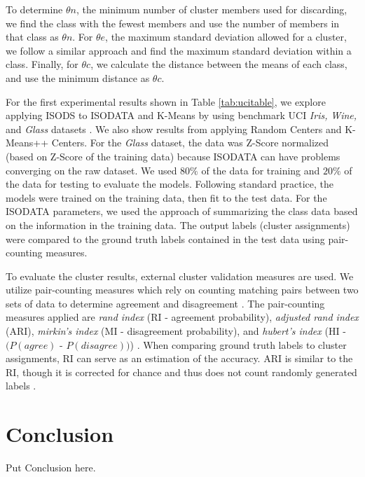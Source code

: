 \documentclass[a4paper,10pt]{article}
\begin{document}
To determine $\theta n$, the minimum number of cluster members used for
discarding, we find the class with the fewest members and use the number of
members in that class as $\theta n$. For $\theta e$, the maximum standard
deviation allowed for a cluster, we follow a similar approach and find the
maximum standard deviation within a class. Finally, for $\theta c$, we calculate
the distance between the means of each class, and use the minimum distance as
$\theta c$. 

For the first experimental results shown in Table \ref{tab:ucitable}, we explore
applying ISODS to ISODATA and K-Means by using benchmark UCI \textit{Iris,}
\textit{Wine,} and \textit{Glass} datasets \cite{Dua2019}. We also show results
from applying Random Centers and K-Means++ Centers. For the \textit{Glass}
dataset, the data was Z-Score normalized (based on Z-Score of the training data)
because ISODATA can have problems converging on the raw dataset. We used $80\%$
of the data for training and $20\%$ of the data for testing to evaluate the
models. Following standard practice, the models were trained on the training
data, then fit to the test data. For the ISODATA parameters, we used the
approach of summarizing the class data based on the information in the training
data. The output labels (cluster assignments) were compared to the ground truth
labels contained in the test data using pair-counting measures. 

To evaluate the cluster results, external cluster validation measures are used.
We utilize pair-counting measures which rely on counting matching pairs between
two sets of data to determine agreement and disagreement \cite{Rezaei2016}. The
pair-counting measures applied are \textit{rand index} (RI - agreement
probability), \textit{adjusted rand index} (ARI), \textit{mirkin's index} (MI -
disagreement probability), and \textit{hubert's index} (HI - $(P(agree)$ -
$P(disagree))$) \cite{Hubert1985, Meila2003}. When comparing ground truth labels
to cluster assignments, RI can serve as an estimation of the accuracy. ARI is
similar to the RI, though it is corrected for chance and thus does not count
randomly generated labels \cite{Rand1971}.


\section{Conclusion}
Put Conclusion here.
\end{document}
